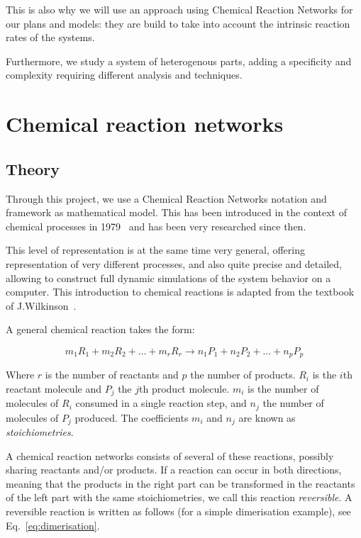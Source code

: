 		This is also why we will use an approach using Chemical Reaction Networks for our plans and models: they are build to take into account the intrinsic reaction rates of the systems.
		
		Furthermore, we study a system of heterogenous parts, adding a specificity and complexity requiring different analysis and techniques.

\section{Chemical reaction networks} %
\label{sec:chemical_reaction_networks}

	\subsection{Theory} %
	\label{sub:theory}
	
	Through this project, we use a Chemical Reaction Networks notation and framework as mathematical model. This has been introduced in the context of chemical processes in 1979~\cite{Feinberg:1979p10907} and has been very researched since then.
	
	This level of representation is at the same time very general, offering representation of very different processes, and also quite precise and detailed, allowing to construct full dynamic simulations of the system behavior on a computer. This introduction to chemical reactions is adapted from the textbook of J.Wilkinson~\cite{JamesWilkinson:2006p10341}.

	A general chemical reaction takes the form:
	
	\begin{equation} \label{eq:general_chemical_reaction}
		m_1 R_1 + m_2 R_2 + \ldots + m_r R_r \xrightarrow{} n_1 P_1 + n_2 P_2 + \ldots + n_p P_p
	\end{equation}
	
	Where $r$ is the number of reactants and $p$ the number of products. $R_i$ is the $i$th reactant molecule and $P_j$ the $j$th product molecule. $m_i$ is the number of molecules of $R_i$ consumed in a single reaction step, and $n_j$ the number of molecules of $P_j$ produced. The coefficients $m_i$ and $n_j$ are known as \textit{stoichiometries}.	
	
	A chemical reaction networks consists of several of these reactions, possibly sharing reactants and/or products. If a reaction can occur in both directions, meaning that the products in the right part can be transformed in the reactants of the left part with the same stoichiometries, we call this reaction \textit{reversible}. A reversible reaction is written as follows (for a simple dimerisation example), see Eq.~\eqref{eq:dimerisation}.
	
